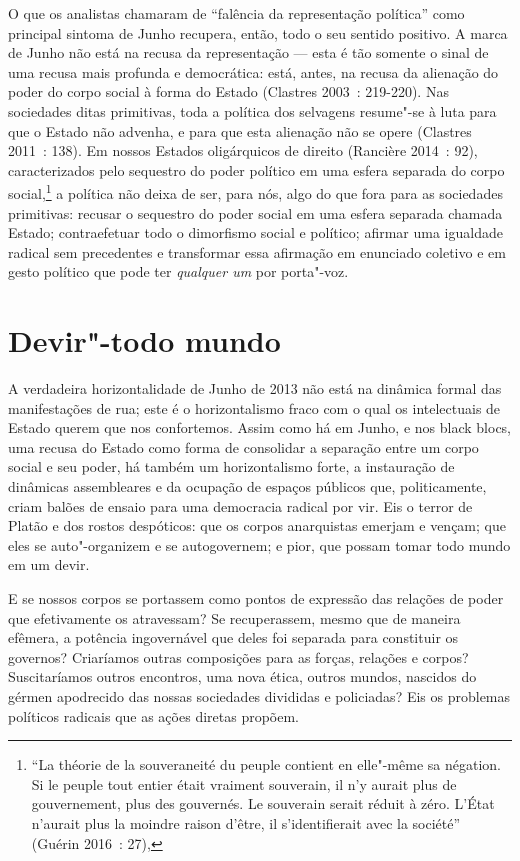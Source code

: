 O que os analistas chamaram de ``falência da representação política''
como principal sintoma de Junho recupera, então, todo o seu sentido
positivo. A marca de Junho não está na recusa da representação --- esta é
tão somente o sinal de uma recusa mais profunda e democrática: está,
antes, na recusa da alienação do poder do corpo social à forma do Estado
(Clastres 2003~: 219-220). Nas sociedades ditas primitivas, toda a
política dos selvagens resume"-se à luta para que o Estado não advenha, e
para que esta alienação não se opere (Clastres 2011~: 138). Em nossos
Estados oligárquicos de direito (Rancière 2014~: 92), caracterizados
pelo sequestro do poder político em uma esfera separada do corpo
social,\footnote{``La théorie de la souveraneité du peuple
  contient en elle"-même sa négation. Si le peuple tout entier était
  vraiment souverain, il n'y aurait plus de gouvernement, plus des
  gouvernés. Le souverain serait réduit à zéro. L'État n'aurait plus la
  moindre raison d'être, il s'identifierait avec la société''
  (Guérin 2016~: 27),} a política não deixa de ser, para nós, algo do
que fora para as sociedades primitivas: recusar o sequestro do poder
social em uma esfera separada chamada Estado; contraefetuar todo o
dimorfismo social e político; afirmar uma igualdade radical sem
precedentes e transformar essa afirmação em enunciado coletivo e em
gesto político que pode ter \emph{qualquer um} por porta"-voz.

\section{Devir"-todo mundo}

A verdadeira horizontalidade de Junho de
2013 não está na dinâmica formal das manifestações de rua; este é o
horizontalismo fraco com o qual os intelectuais de Estado querem que nos
confortemos. Assim como há em Junho, e nos black blocs, uma
recusa do Estado como forma de consolidar a separação entre um corpo
social e seu poder, há também um horizontalismo forte, a instauração de
dinâmicas assembleares e da ocupação de espaços públicos que,
politicamente, criam balões de ensaio para uma democracia radical por
vir. Eis o terror de Platão e dos rostos despóticos: que os corpos
anarquistas emerjam e vençam; que eles se auto"-organizem e se
autogovernem; e pior, que possam tomar todo mundo em um devir.

E se nossos corpos se portassem como pontos de expressão das relações de
poder que efetivamente os atravessam? Se recuperassem, mesmo que de
maneira efêmera, a potência ingovernável que deles foi separada para
constituir os governos? Criaríamos outras composições para as forças,
relações e corpos? Suscitaríamos outros encontros, uma nova ética,
outros mundos, nascidos do gérmen apodrecido das nossas sociedades
divididas e policiadas? Eis os problemas políticos radicais que as ações
diretas propõem.

